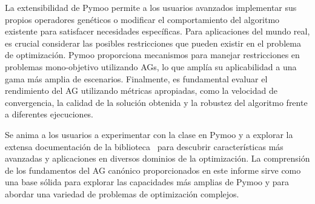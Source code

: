 La extensibilidad de Pymoo permite a los usuarios avanzados implementar sus propios operadores genéticos o modificar el comportamiento del algoritmo \texttt{} existente para satisfacer necesidades específicas. Para aplicaciones del mundo real, es crucial considerar las posibles restricciones que pueden existir en el problema de optimización. Pymoo proporciona mecanismos para manejar restricciones en problemas mono-objetivo utilizando AGs, lo que amplía su aplicabilidad a una gama más amplia de escenarios. Finalmente, es fundamental evaluar el rendimiento del AG utilizando métricas apropiadas, como la velocidad de convergencia, la calidad de la solución obtenida y la robustez del algoritmo frente a diferentes ejecuciones.

Se anima a los usuarios a experimentar con la clase \texttt{} en Pymoo y a explorar la extensa documentación de la biblioteca~\cite{blank2020} para descubrir características más avanzadas y aplicaciones en diversos dominios de la optimización. La comprensión de los fundamentos del AG canónico proporcionados en este informe sirve como una base sólida para explorar las capacidades más amplias de Pymoo y para abordar una variedad de problemas de optimización complejos.
